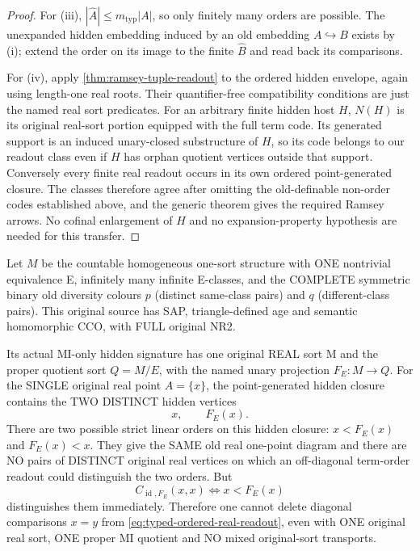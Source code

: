 \begin{proof}
For (iii), $|\widehat A|\le m_{\mathrm{typ}}|A|$, so only
finitely many orders are possible. The unexpanded hidden
embedding induced by an old embedding $A\hookrightarrow B$
exists by (i); extend the order on its image to the finite
$\widehat B$ and read back its comparisons.

For (iv), apply \cref{thm:ramsey-tuple-readout} to the ordered
hidden envelope, again using length-one real roots. Their
quantifier-free compatibility conditions are just the named
real sort predicates. For an arbitrary finite hidden host $H$,
$N(H)$ is its original real-sort portion equipped with the full
term code. Its generated support is an induced unary-closed
substructure of $H$, so its code belongs to our readout class
even if $H$ has orphan quotient vertices outside that support.
Conversely every finite real readout occurs in its own ordered
point-generated closure. The classes therefore agree after
omitting the old-definable non-order codes established above,
and the generic theorem gives the required Ramsey arrows.
No cofinal enlargement of $H$ and no expansion-property
hypothesis are needed for this transfer.
\end{proof}

\begin{example}
\label{ex:typed-diagonal-term-order-necessary}
Let $M$ be the countable
homogeneous one-sort
structure with ONE
nontrivial equivalence E,
infinitely many infinite
E-classes, and the COMPLETE
symmetric binary old
diversity colours
$p$ (distinct same-class
pairs) and $q$
(different-class pairs).
This original source has
SAP, triangle-defined age
and semantic homomorphic
CCO, with FULL original
NR2.

Its actual MI-only hidden
signature has one original
REAL sort M and the
proper quotient sort
$Q=M/E$, with the
named unary projection
$F_E:M\to Q$. For the
SINGLE original real
point $A=\{x\}$,
the point-generated
hidden closure contains
the TWO DISTINCT
hidden vertices
\[
                       x,\qquad F_E(x).
\]
There are two possible
strict linear orders
on this hidden closure:
$x<F_E(x)$ and
$F_E(x)<x$. They give
the SAME old real
one-point diagram and
there are NO pairs of
DISTINCT original real
vertices on which an
off-diagonal term-order
readout could distinguish
the two orders. But
\[
   C_{\operatorname{id},F_E}(x,x)
       \Longleftrightarrow x<F_E(x)
\]
distinguishes them
immediately. Therefore
one cannot delete
diagonal comparisons
$x=y$ from
\eqref{eq:typed-ordered-real-readout},
even with ONE original
real sort, ONE proper
MI quotient and NO
mixed original-sort
transports.
\end{example}

